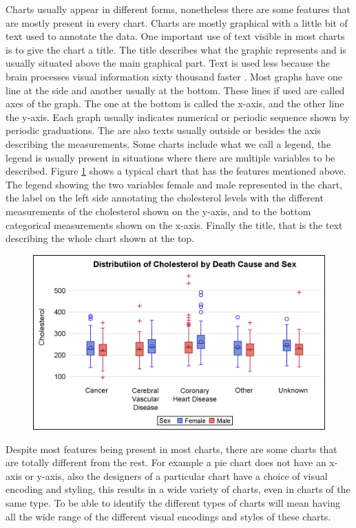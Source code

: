 \documentclass[12pt, a4paper,oneside]{report}
\begin{document}
Charts usually appear in different forms, nonetheless there are some features that are mostly present in every chart. Charts are mostly graphical with a little bit of text used to annotate the data. One important use of text visible in most charts is to give the chart a title. The title describes what the graphic represents and is usually situated above the main graphical part. Text is used less because the brain processes visual information sixty thousand faster \cite{humaneye}. Most graphs have one line at the side and another usually at the bottom. These lines if used are called axes of the graph. The one at the bottom is called the x-axis, and the other line the y-axis. Each graph usually indicates numerical or periodic sequence shown by periodic graduations. The are also texts usually outside or besides the axis describing the measurements.
Some charts include what we call a legend, the legend is usually present in situations where there are multiple variables to be described. Figure \ref{fig:boxy} shows a typical chart that has the features mentioned above. The legend showing the two variables female and male represented in the chart, the label on the left side annotating the cholesterol levels with the different measurements of the cholesterol shown on the y-axis, and to the bottom categorical measurements shown on the x-axis. Finally the title, that is the text describing the whole chart shown at the top. 

\begin{figure}[!htb]
	\centering
	\includegraphics [scale=1.0] {box_color.png}
	\label{fig:boxy}
\end{figure}

Despite most features being present in most charts, there are some charts that are totally different from the rest. For example a pie chart does not have an x-axis or y-axis, also the designers of a particular chart have a choice of visual encoding and styling, this results in a wide variety of charts, even in charts of the same type. To be able to identify the different types of charts will mean having all the wide range of the different visual encodings and styles of these charts.
\end{document}
